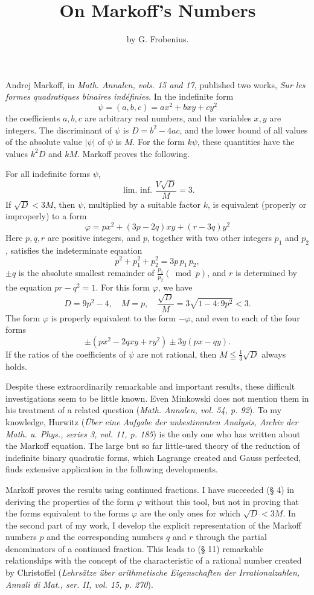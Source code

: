 \documentclass[12pt]{article}
\title{On Markoff's Numbers}
\author{by G. Frobenius.}
\date{}
\begin{document}
\maketitle
Andrej Markoff, in \textit{Math. Annalen, vols. 15 and 17}, published two works, \textit{Sur les formes quadratiques binaires indéfinies}. In the indefinite form
$$
\psi=(a, b, c)=a x^{2}+b x y+c y^{2}
$$
the coefficients $a, b, c$ are arbitrary real numbers, and the variables $x, y$ are integers. The discriminant of $\psi$ is $D=b^{2}-4 a c$, and the lower bound of all values of the absolute value $|\psi|$ of $\psi$ is $M$. For the form $k \psi$, these quantities have the values $k^{2} D$ and $k M$.  Markoff proves the following.

For all indefinite forms $\psi$,
$$
\text{ lim. inf. } \frac{V \sqrt{D}}{M}=3 .
$$
If $\sqrt{D}<3 M$, then $\psi$, multiplied by a suitable factor $k$, is equivalent (properly or improperly) to a form
$$
\varphi=p x^{2}+(3 p-2 q) x y+(r-3 q) y^{2}
$$
Here $p, q, r$ are positive integers, and $p$, together with two other integers $p_{1}$ and $p_{2}$, satisfies the indeterminate equation
$$
p^{2}+p_{1}^{2}+p_{2}^{2} = 3 p\, p_{1}\, p_{2},
$$
$\pm q$ is the absolute smallest remainder of $\frac{p_{1}}{p_{2}}(\bmod p)$, and $r$ is determined by the equation $p r-q^{2}=1$. For this form $\varphi$, we have
$$
D=9 p^{2}-4, \quad M=p, \quad \frac{\sqrt{D}}{M}=3 \sqrt{1-4: 9 p^{2}}<3 .
$$
The form $\varphi$ is properly equivalent to the form $-\varphi$, and even to each of the four forms
$$
\pm\left(p x^{2}-2 q x y+r y^{2}\right) \pm 3 y(p x-q y) .
$$
If the ratios of the coefficients of $\psi$ are not rational, then $M \leqq \frac{1}{3} \sqrt{D}$ always holds.

Despite these extraordinarily remarkable and important results, these difficult investigations seem to be little known. Even Minkowski does not mention them in his treatment of a related question (\textit{Math. Annalen, vol. 54, p. 92}). To my knowledge, Hurwitz (\textit{Über eine Aufgabe der unbestimmten Analysis, Archiv der Math. u. Phys., series 3, vol. 11, p. 185}) is the only one who has written about the Markoff equation. The large but so far little-used theory of the reduction of indefinite binary quadratic forms, which Lagrange created and Gauss perfected, finds extensive application in the following developments.

Markoff proves the results using continued fractions. I have succeeded (§ 4) in deriving the properties of the form $\varphi$ without this tool, but not in proving that the forms equivalent to the forms $\varphi$ are the only ones for which $\sqrt{D}<3M$. In the second part of my work, I develop the explicit representation of the Markoff numbers $p$ and the corresponding numbers $q$ and $r$ through the partial denominators of a continued fraction. This leads to (§ 11) remarkable relationships with the concept of the characteristic of a rational number created by Christoffel (\textit{Lehrsätze über arithmetische Eigenschaften der Irrationalzahlen, Annali di Mat., ser. II, vol. 15, p. 270}).
\end{document}
